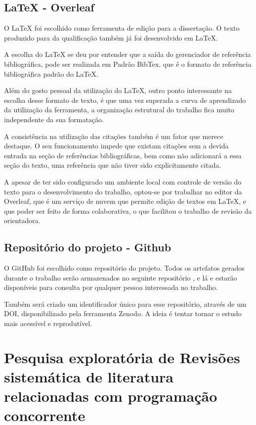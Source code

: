 \subsection{LaTeX - Overleaf}

O LaTeX foi escolhido como ferramenta de edição para a dissertação. O texto produzido para da qualificação também já foi desenvolvido em LaTeX.

A escolha do LaTeX se deu por entender que a saída do gerenciador de referência bibliográfica, pode ser realizada em Padrão BibTex. que é o formato de referência bibliográfica padrão do LaTeX. 

Além do gosto pessoal da utilização do LaTeX, outro ponto interessante na escolha desse formato de texto, é que uma vez superada a curva de aprendizado da utilização da ferramenta, a organização estrutural do trabalho fica muito independente da sua formatação. 

A consistência na utilização das citações também é um fator que merece destaque. O seu funcionamento impede que existam citações sem a devida entrada na seção de referências bibliográficas, bem como não adicionará a essa seção do texto, uma referência que não tiver sido explicitamente citada.

A apesar de ter sido configurado um ambiente local com controle de versão do texto para o desenvolvimento do trabalho, optou-se por trabalhar no editor da Overleaf, que é um serviço de nuvem que permite edição de textos em LaTeX, e que poder ser feito de forma colaborativa, o que facilitou o trabalho de revisão da orientadora.

\subsection{Repositório do projeto - Github}

O GitHub foi escolhido como repositório do projeto. Todos os artefatos gerados durante o trabalho serão armazenados no seguinte repositório \cite{repositorioGithub}, e lá e estarão disponíveis para consulta por qualquer pessoa interessada no trabalho. 

Também será criado um identificador único para esse repositório, através de um DOI, disponibilizado pela ferramenta Zenodo. A ideia é tentar tornar o estudo mais acessível e reprodutível.  

\section{Pesquisa exploratória de Revisões sistemática de literatura relacionadas com programação concorrente}

